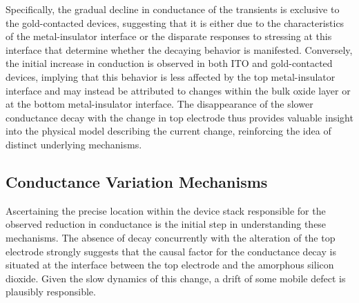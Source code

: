 

\noindent Specifically, the gradual decline in conductance of the transients is exclusive to the gold-contacted devices, suggesting that it is either due to the characteristics of the metal-insulator interface or the disparate responses to stressing at this interface that determine whether the decaying behavior is manifested. Conversely, the initial increase in conduction is observed in both ITO and gold-contacted devices, implying that this behavior is less affected by the top metal-insulator interface and may instead be attributed to changes within the bulk oxide layer or at the bottom metal-insulator interface. The disappearance of the slower conductance decay with the change in top electrode thus provides valuable insight into the physical model describing the current change, reinforcing the idea of distinct underlying mechanisms.

\subsection[Conductance Variation Mechanisms]{Conductance Variation Mechanisms}


\noindent Ascertaining the precise location within the device stack responsible for the observed reduction in conductance is the initial step in understanding these mechanisms. The absence of decay concurrently with the alteration of the top electrode strongly suggests that the causal factor for the conductance decay is situated at the interface between the top electrode and the amorphous silicon dioxide. Given the slow dynamics of this change, a drift of some mobile defect is plausibly responsible.\\


